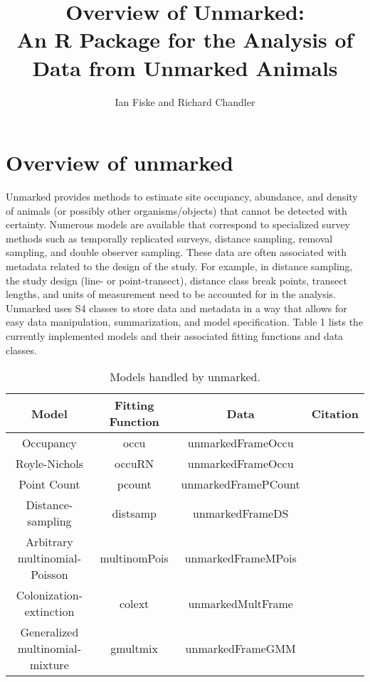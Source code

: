 \documentclass[a4paper]{article}
\title{Overview of Unmarked:\\
An R Package for the Analysis of Data from Unmarked Animals}
\author{Ian Fiske and Richard Chandler}
\begin{document}
\maketitle



\section{Overview of unmarked}

Unmarked provides methods to estimate site occupancy, abundance, and
density of animals (or possibly other organisms/objects) that cannot be
detected with certainty. Numerous models are available that correspond
to specialized survey methods such as temporally replicated surveys,
distance sampling, removal sampling, and double observer
sampling. These data are often associated with metadata related to the
design of the study. For example, in distance sampling, the study
design (line- or point-transect), distance class break points,
transect lengths, and units of measurement need to be accounted for in
the analysis. Unmarked uses S4 classes to store data and metadata in a
way that allows for easy data manipulation, summarization, and model
specification. Table 1 lists the currently implemented models and
their associated fitting functions and data classes.

\begin{table}[!h] %
\centering
\begin{tabular}{cccc}
\hline
Model & Fitting Function & Data & Citation \\ \hline
Occupancy & occu & unmarkedFrameOccu & \citep{mackenzie_estimating_2002} \\
Royle-Nichols & occuRN & unmarkedFrameOccu & \citep{royle_estimating_2003} \\
Point Count & pcount & unmarkedFramePCount & \citep{royle_n-mixture_2004} \\
Distance-sampling & distsamp & unmarkedFrameDS & \citep{royle_modeling_2004} \\
Arbitrary multinomial-Poisson & multinomPois & unmarkedFrameMPois & \citep{royle_generalized_2004} \\
Colonization-extinction & colext & unmarkedMultFrame & \citep{mackenzie_estimating_2003} \\
Generalized multinomial-mixture & gmultmix & unmarkedFrameGMM & \citep{royle_generalized_2004} \\
\hline
\end{tabular}
\caption{Models handled by unmarked.}
\label{tab:models}
\end{table}
\end{document}
